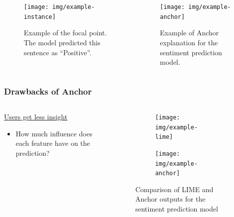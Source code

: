 \documentclass[aspectratio=169]{slide-en}
\begin{document}
\begin{frame}{}
  \begin{columns}[]
    \begin{column}{0.35\textwidth}
      \begin{figure}
        \centering
        \texttt{[image: img/example-instance]}
        \vspace{-0.8em}
        \caption{%
          Example of the focal point.
          The model predicted this sentence as ``Positive''.
        }
      \end{figure}
    \end{column}
    \begin{column}{0.4\textwidth}
      \vspace{1.0em}
      \begin{figure}
        \texttt{[image: img/example-anchor]}
        \vspace{-0.0em}
        \caption{%
          Example of Anchor explanation for the sentiment prediction model.
        }
      \end{figure}
    \end{column}
  \end{columns}
\end{frame}

\subsubsection{Drawbacks of Anchor}

\begin{frame}{}
  \begin{columns}[]
    \begin{column}{0.45\textwidth}
      \underline{Users get less insight}

      \bigskip
      \begin{itemize}
        \item How much influence does each feature have on the prediction?
      \end{itemize}
    \end{column}
    \begin{column}{0.5\textwidth}
      \begin{figure}
        \begin{subfigure}[t]{\textwidth}
          \centering
          \texttt{[image: img/example-lime]}
        \end{subfigure}
        \begin{subfigure}[t]{\textwidth}
          \centering
          \vspace{0.5em}
          \texttt{[image: img/example-anchor]}
        \end{subfigure}
        \vspace{0.5em}
        \caption{Comparison of LIME and Anchor outputs for the sentiment prediction model}
      \end{figure}
    \end{column}
  \end{columns}
\end{frame}
\end{document}
